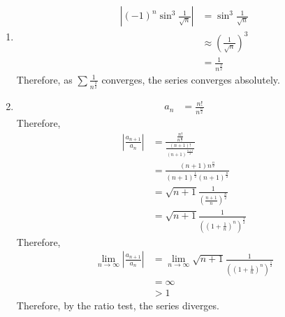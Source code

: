 \documentclass[fleqn, a4paper, 12pt, twoside]{article}
\theoremstyle{definition}
\theoremstyle{theorem}
\begin{document}
\begin{solution}
	\begin{enumerate}[leftmargin = *]
		\item
			\begin{align*}
				\left| (-1)^n \sin^3 \frac{1}{\sqrt{n}} \right| & = \sin^3 \frac{1}{\sqrt{n}}                 \\
                                                                                & \approx \left( \frac{1}{\sqrt{n}} \right)^3 \\
                                                                                & = \frac{1}{n^{\frac{3}{2}}}
			\end{align*}
			Therefore, as $\sum \frac{1}{n^{\frac{3}{2}}}$ converges, the series converges absolutely.
		\item
			\begin{align*}
				a_n & = \frac{n!}{n^{\frac{n}{2}}}
			\end{align*}
			Therefore,
			\begin{align*}
				\left| \frac{a_{n + 1}}{a_n} \right| & = \frac{\frac{n!}{n^{\frac{n}{2}}}}{\frac{(n + 1)!}{(n + 1)^{\frac{n + 1}{2}}}} \\
                                                                     & = \frac{(n + 1) n^{\frac{n}{2}}}{(n + 1)^{\frac{1}{2}} (n + 1)^{\frac{n}{2}}}   \\
                                                                     & = \sqrt{n + 1} \frac{1}{\left( \frac{n + 1}{n} \right)^{\frac{n}{2}}}           \\
                                                                     & = \sqrt{n + 1} \frac{1}{\left( \left( 1 + \frac{1}{n} \right)^n \right)^{\frac{1}{2}}}
			\end{align*}
			Therefore,
			\begin{align*}
				\lim\limits_{n \to \infty} \left| \frac{a_{n + 1}}{a_n} \right| & = \lim\limits_{n \to \infty} \sqrt{n + 1} \frac{1}{\left( \left( 1 + \frac{1}{n} \right)^n \right)^{\frac{1}{2}}} \\
                                                                                                & = \infty                                                                                                          \\
                                                                                                & > 1
			\end{align*}
			Therefore, by the ratio test, the series diverges.
	\end{enumerate}
\end{solution}
\end{document}
